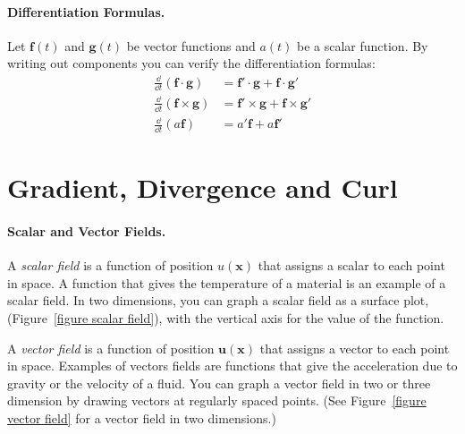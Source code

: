 \paragraph{Differentiation Formulas.}
Let $\mathbf{f}(t)$ and $\mathbf{g}(t)$ be vector functions and $a(t)$ be a scalar
function.  By writing out components you can verify the differentiation
formulas:
\begin{align*}
  \frac{\dd}{\dd t} (\mathbf{f} \cdot \mathbf{g}) &= \mathbf{f}' \cdot \mathbf{g}
  + \mathbf{f} \cdot \mathbf{g}' \\
  \frac{\dd}{\dd t} (\mathbf{f} \times \mathbf{g}) &= \mathbf{f}' \times \mathbf{g}
  + \mathbf{f} \times \mathbf{g}' \\
  \frac{\dd}{\dd t} (a \mathbf{f}) &= a' \mathbf{f} + a \mathbf{f}'
\end{align*}









\section{Gradient, Divergence and Curl}


\paragraph{Scalar and Vector Fields.}
A \textit{scalar field} is a function of position $u(\mathbf{x})$ that assigns 
a scalar to each point in space.  A function that gives the temperature of
a material is an example of a scalar field.  In two dimensions, you can graph 
a scalar field as a surface plot, (Figure~\ref{figure scalar field}),  
with the vertical axis for the value of the function.  

A \textit{vector field} is a function of position $\mathbf{u}(\mathbf{x})$ that
assigns a vector to each point in space.  Examples of vectors fields are
functions that give the acceleration due to gravity or the velocity of 
a fluid.  You can graph a vector field in two or three dimension by 
drawing vectors at regularly spaced points.  
(See Figure~\ref{figure vector field} for a vector field in two dimensions.)

